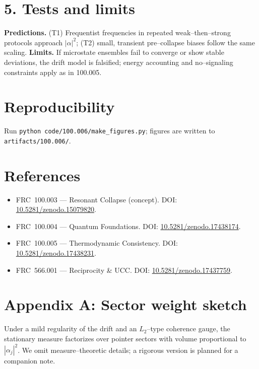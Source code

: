 \documentclass[10pt]{article}
\begin{document}
\section*{5. Tests and limits}
\textbf{Predictions.} (T1) Frequentist frequencies in repeated weak--then--strong protocols approach $|\alpha|^2$; (T2) small, transient pre--collapse biases follow the same scaling.\newline
\textbf{Limits.} If microstate ensembles fail to converge or show stable deviations, the drift model is falsified; energy accounting and no--signaling constraints apply as in 100.005.

\section*{Reproducibility}
Run \verb|python code/100.006/make_figures.py|; figures are written to \verb|artifacts/100.006/|.

\section*{References}
\small
\begin{itemize}
  \item FRC~100.003 — Resonant Collapse (concept). DOI: \href{https://doi.org/10.5281/zenodo.15079820}{10.5281/zenodo.15079820}.
  \item FRC~100.004 — Quantum Foundations. DOI: \href{https://doi.org/10.5281/zenodo.17438174}{10.5281/zenodo.17438174}.
  \item FRC~100.005 — Thermodynamic Consistency. DOI: \href{https://doi.org/10.5281/zenodo.17438231}{10.5281/zenodo.17438231}.
  \item FRC~566.001 — Reciprocity \& UCC. DOI: \href{https://doi.org/10.5281/zenodo.17437759}{10.5281/zenodo.17437759}.
\end{itemize}

\section*{Appendix A: Sector weight sketch}
Under a mild regularity of the drift and an $L_2$--type coherence gauge, the stationary measure factorizes over pointer sectors with volume proportional to $|\alpha_j|^2$. We omit measure--theoretic details; a rigorous version is planned for a companion note.
\end{document}
